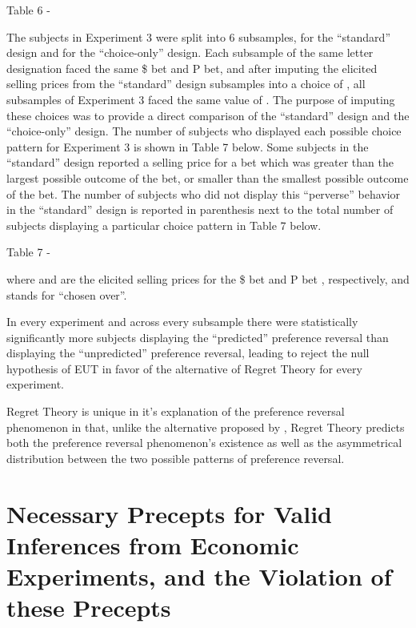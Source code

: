 \documentclass[../main.tex]{subfiles}
\begin{document}
Table 6 - \textcite{Loomes1989}

The subjects in Experiment 3 were split into 6 subsamples,  for the \enquote{standard} design and  for the \enquote{choice-only} design.
Each subsample of the same letter designation faced the same \$ bet and P bet, and after imputing the elicited selling prices from the \enquote{standard} design subsamples into a choice of , all subsamples of Experiment 3 faced the same value of .
The purpose of imputing these choices was to provide a direct comparison of the \enquote{standard} design and the  \enquote{choice-only} design.
The number of subjects who displayed each possible choice pattern for Experiment 3 is shown in Table 7 below.
Some subjects in the \enquote{standard} design reported a selling price for a bet which was greater than the largest possible outcome of the bet, or smaller than the smallest possible outcome of the bet.
The number of subjects who did not display this \enquote{perverse} behavior in the \enquote{standard} design is reported in parenthesis next to the total number of subjects displaying a particular choice pattern in Table 7 below.


Table 7 - \textcite{Loomes1989}


where  and  are the elicited selling prices for the \$ bet and P bet , respectively, and  stands for \enquote{chosen over}.

In every experiment and across every subsample there were statistically significantly more subjects displaying the \enquote{predicted} preference reversal than displaying the \enquote{unpredicted} preference reversal, leading \textcite{Loomes1989} to reject the null hypothesis of EUT in favor of the alternative of Regret Theory for every experiment.

Regret Theory is unique in it's explanation of the preference reversal phenomenon in that, unlike the alternative proposed by \textcite{Karni1987}, Regret Theory predicts both the preference reversal phenomenon's existence as well as the asymmetrical distribution between the two possible patterns of preference reversal. 


\section{Necessary Precepts for Valid Inferences from Economic Experiments, and the Violation of these Precepts}
\end{document}
